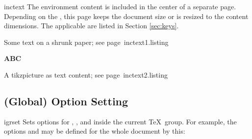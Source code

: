 \documentclass[a4paper,11pt]{ltxdoc}
\begin{document}
\begin{docEnvironment}{inctext}{}
  The environment content is included in the center
  of a separate page. Depending on the , this page keeps the
  document size or is resized to the content dimensions.
  The applicable  are listed in Section \ref{sec:keys}.


\begin{texexptitled}%
  {Some text on a shrunk paper; see page~\pageref{inctext1}}{inctext1.listing}
\begin{inctext}[paper=graphics,label={inctext1},bookmark={A huge ABC}]
  \fontsize{20mm}{20mm}\selectfont\bfseries ABC
\end{inctext}
\end{texexptitled}


\begin{texexptitled}%
  {A tikzpicture as text content; see page~\pageref{inctext2}}{inctext2.listing}
\begin{inctext}[paper=a6,landscape,label={inctext2},bookmark={Graph},
    overlay page number at bottom=8mm]
\end{inctext}
\end{texexptitled}
\end{docEnvironment}


\subsection{(Global) Option Setting}

\begin{docCommand}{igrset}{}
  Sets options for , , and
   inside the current \TeX\ group.
  For example, the options  and
   may be defined for the whole document by this:
\begin{dispListing}
\end{dispListing}
\end{docCommand}
\end{document}
